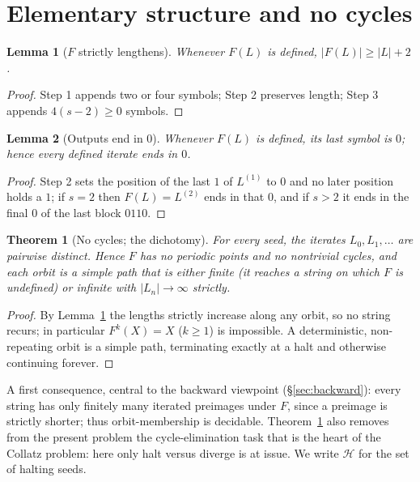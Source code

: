 \documentclass[11pt,reqno]{amsart}
\theoremstyle{plain}
\newtheorem{thm}[theorem]{Theorem}
\newtheorem{lemma}{Lemma}
\theoremstyle{definition}
\theoremstyle{remark}
\begin{document}
\section{Elementary structure and no cycles}\label{sec:elem}
\begin{lemma}[$F$ strictly lengthens]\label{lem:length}
Whenever $F(L)$ is defined, $|F(L)|\ge|L|+2$.
\end{lemma}
\begin{proof}
Step 1 appends two or four symbols; Step 2 preserves length; Step 3 appends $4(s-2)\ge 0$ symbols.
\end{proof}

\begin{lemma}[Outputs end in $0$]\label{lem:end0}
Whenever $F(L)$ is defined, its last symbol is $0$; hence every defined iterate ends in $0$.
\end{lemma}
\begin{proof}
Step 2 sets the position of the last $1$ of $L^{(1)}$ to $0$ and no later position holds a $1$; if $s=2$ then $F(L)=L^{(2)}$ ends in that $0$, and if $s>2$ it ends in the final $0$ of the last block $0110$.
\end{proof}

\begin{thm}[No cycles; the dichotomy]\label{thm:nocycles}
For every seed, the iterates $L_0,L_1,\dots$ are pairwise distinct. Hence $F$ has no periodic points and no nontrivial cycles, and each orbit is a simple path that is either finite (it reaches a string on which $F$ is undefined) or infinite with $|L_n|\to\infty$ strictly.
\end{thm}
\begin{proof}
By Lemma~\ref{lem:length} the lengths strictly increase along any orbit, so no string recurs; in particular $F^k(X)=X$ ($k\ge 1$) is impossible. A deterministic, non-repeating orbit is a simple path, terminating exactly at a halt and otherwise continuing forever.
\end{proof}

A first consequence, central to the backward viewpoint (\S\ref{sec:backward}): every string has only finitely many iterated preimages under $F$, since a preimage is strictly shorter; thus orbit-membership is decidable. Theorem~\ref{thm:nocycles} also removes from the present problem the cycle-elimination task that is the heart of the Collatz problem: here only halt versus diverge is at issue. We write $\mathcal H$ for the set of halting seeds.
\end{document}
